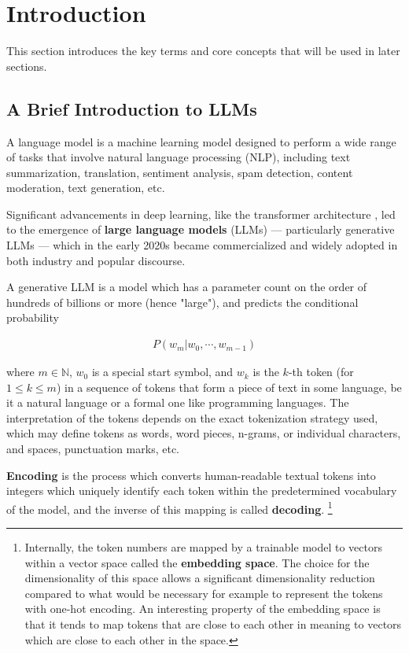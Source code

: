\documentclass[noindent,nohyp,parspace,titlepage,twoside,12pt]{article}
\begin{document}
  \section{Introduction}

    This section introduces the key terms and core concepts that will be used
    in later sections.

    \subsection{A Brief Introduction to LLMs}

      A language model is a machine learning model designed to perform a wide
      range of tasks that involve natural language processing (NLP), including
      text summarization, translation, sentiment analysis, spam detection,
      content moderation, text generation, etc.

      Significant advancements in deep learning, like the transformer
      architecture \cite{attention,gpt3,gpt4}, led to the emergence of
      \textbf{large language models} (LLMs) --- particularly generative LLMs
      --- which in the early 2020s became commercialized and widely adopted in
      both industry and popular discourse.

      A generative LLM is a model which has a parameter count on the order of
      hundreds of billions or more (hence "large"), and predicts the conditional
      probability \cite{llms}

      \begin{align} \label{eqautoreg}
        P(w_m | w_0, \cdots, w_{m-1})
      \end{align}

      where $m \in \mathbb{N}$, $w_0$ is a special start symbol, and $w_k$ is
      the $k$-th token (for $1 \le k \le m$) in a sequence of tokens that form
      a piece of text in some language, be it a natural language or a formal
      one like programming languages. The interpretation of the tokens depends
      on the exact tokenization strategy used, which may define tokens as
      words, word pieces, n-grams, or individual characters, and spaces,
      punctuation marks, etc.

      \textbf{Encoding} is the process which converts human-readable textual
      tokens into integers which uniquely identify each token within the
      predetermined vocabulary of the model, and the inverse of this mapping
      is called \textbf{decoding}. \footnote{Internally, the token numbers are
      mapped by a trainable model to vectors within a vector space called the
      \textbf{embedding space}. The choice for the dimensionality of this space
      allows a significant dimensionality reduction compared to what would be
      necessary for example to represent the tokens with one-hot encoding. An
      interesting property of the embedding space is that it tends to map
      tokens that are close to each other in meaning to vectors which are close
      to each other in the space.}
\end{document}
